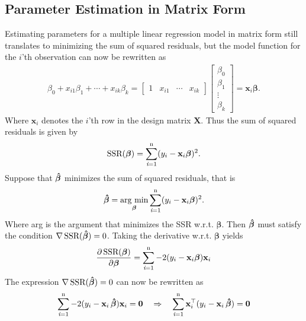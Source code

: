 \subsection{Parameter Estimation in Matrix Form}
Estimating parameters for a multiple linear regression model in matrix form still translates to minimizing the sum of squared residuals, but the model function for the $i$'th observation can now be rewritten as
\begin{align*}
    \beta_0 + x_{i1} \beta_1 + \cdots + x_{ik}\beta_k =
    \begin{bmatrix} 
    1 & x_{i1} & \cdots & x_{ik}  
    \end{bmatrix} 
    \begin{bmatrix}
    \beta_0 \\ \beta_1 \\ \vdots \\ \beta_k
    \end{bmatrix} = \mathbf{x}_i \boldsymbol{\beta}.
\end{align*}
Where $\mathbf{x}_i$ denotes the $i$'th row in the design matrix $\mathbf{X}$.
Thus the sum of squared residuals is given by
\begin{align*}
    \operatorname{\text{SSR}}(\boldsymbol{\beta}) = \operatorname{\sum_{\textit{i}=1}^n} (y_i - \mathbf{x}_i\boldsymbol{\beta})^2.
\end{align*}
Suppose that $\operatorname{\boldsymbol{\hat{\beta}}}$ minimizes the sum of squared residuals, that is
\begin{align*}
    \operatorname{\boldsymbol{\hat{\beta}}} = \underset{\boldsymbol{\beta}}{\operatorname{\text{arg min}}} \operatorname{\sum_{\textit{i}=1}^n} (y_i - \mathbf{x}_i\boldsymbol{\beta})^2.
\end{align*}
Where arg is the argument that minimizes the SSR w.r.t.$\!$ $\boldsymbol{\beta}$. Then $\operatorname{\boldsymbol{\hat{\beta}}}$ must satisfy the condition $\nabla \operatorname{\text{SSR}}(\operatorname{\boldsymbol{\hat{\beta}}}) = 0$.
Taking the derivative w.r.t. $\boldsymbol{\beta}$ yields
\begin{align}\label{eq:ssr_derivative}
    \frac{\partial \operatorname{\text{SSR}}(\boldsymbol{\beta})}{\partial \boldsymbol{\beta}} 
    =  \operatorname{\sum_{\textit{i}=1}^n} -2(y_i - \mathbf{x}_i \boldsymbol{\beta})\mathbf{x}_i
\end{align}
The expression $\nabla \operatorname{\text{SSR}} (\operatorname{\boldsymbol{\hat{\beta}}}) = 0$ can now be rewritten as
\begin{align*}
    \operatorname{\sum_{\textit{i}=1}^n} -2(y_i - \mathbf{x}_i \operatorname{\boldsymbol{\hat{\beta}}})\mathbf{x}_i = \mathbf{0} 
    \quad \Rightarrow \quad
    \operatorname{\sum_{\textit{i}=1}^n} \mathbf{x}_i^\top(y_i - \mathbf{x}_i \operatorname{\boldsymbol{\hat{\beta}}}) = \mathbf{0}
\end{align*}
